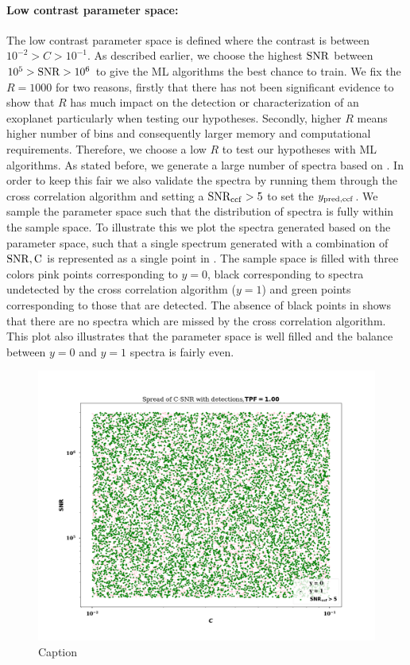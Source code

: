 \paragraph{Low contrast parameter space:\\}
The low contrast parameter space is defined where the contrast is between $10^{-2}>C>10^{-1}$.
As described earlier, we choose the highest $\rm{SNR}$ between $10^{5}>\rm{SNR}>10^{6}$ to give the ML algorithms the best chance to train.
We fix the $R=1000$ for two reasons, firstly that there has not been significant evidence to show that $R$ has much impact on the detection or characterization of an exoplanet particularly when testing our hypotheses.
Secondly, higher $R$ means higher number of bins and consequently larger memory and computational requirements.
Therefore, we choose a low $R$ to test our hypotheses with ML algorithms.
As stated before, we generate a large number of spectra based on .
In order to keep this fair we also validate the spectra by running them through the cross correlation algorithm and setting a $\rm{SNR_{ccf}}>5$ to set the $y_{\rm{pred,ccf}}$.
We sample the parameter space such that the distribution of spectra is fully within the sample space.
To illustrate this we plot the spectra generated based on the parameter space, such that a single spectrum generated with a combination of $\rm{SNR},C$ is represented as a single point in .
The sample space is filled with three colors pink points corresponding to $y=0$, black corresponding to spectra undetected by the cross correlation algorithm ($y=1$) and green points corresponding to those that are detected. 
The absence of black points in  shows that there are no spectra which are missed by the cross correlation algorithm.
This plot also illustrates that the parameter space is well filled and the balance between $y=0$ and $y=1$ spectra is fairly even.
\begin{figure}[!h]
    \centering
    \includegraphics[scale=0.4]{images/Chapter3/samples_trained.png}
    \caption{Caption}
    \label{fig:trained_sample space}
\end{figure}
